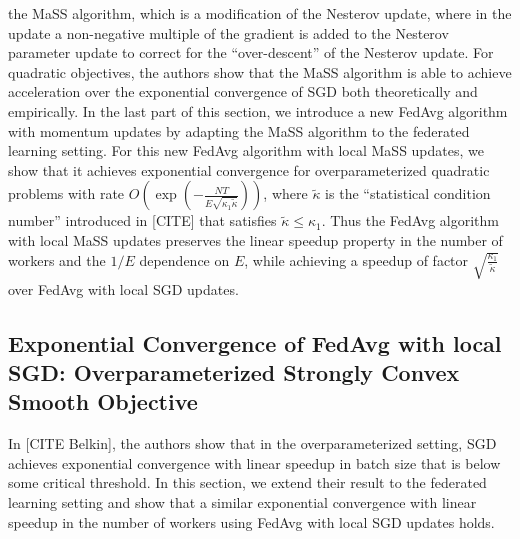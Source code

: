 the MaSS algorithm, which is a modification of the Nesterov update,
where in the update a non-negative multiple of the gradient is added
to the Nesterov parameter update to correct for the ``over-descent''
of the Nesterov update. For quadratic objectives, the authors show
that the MaSS algorithm is able to achieve acceleration over the exponential
convergence of SGD both theoretically and empirically. In the last
part of this section, we introduce a new FedAvg algorithm with momentum
updates by adapting the MaSS algorithm to the federated learning setting.
For this new FedAvg algorithm with local MaSS updates, we show that
it achieves exponential convergence for overparameterized quadratic
problems with rate $O(\exp(-\frac{NT}{E\sqrt{\kappa_{1}\tilde{\kappa}}}))$,
where $\tilde{\kappa}$ is the ``statistical condition number''
introduced in {[}CITE{]} that satisfies $\tilde{\kappa}\leq\kappa_{1}$.
Thus the FedAvg algorithm with local MaSS updates preserves the linear
speedup property in the number of workers and the $1/E$ dependence
on $E$, while achieving a speedup of factor $\sqrt{\frac{\kappa_{1}}{\tilde{\kappa}}}$
over FedAvg with local SGD updates. 

\subsection{Exponential Convergence of FedAvg with local SGD: Overparameterized
	Strongly Convex Smooth Objective}

In {[}CITE Belkin{]}, the authors show that in the overparameterized
setting, SGD achieves exponential convergence with linear speedup
in batch size that is below some critical threshold. In this section,
we extend their result to the federated learning setting and show
that a similar exponential convergence with linear speedup in the
number of workers using FedAvg with local SGD updates holds. 

